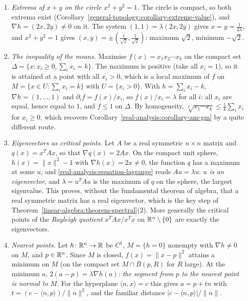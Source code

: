 \begin{example}\label{real-analysis:example-lagrange}
\begin{enumerate}
\item \emph{Extrema of $x + y$ on the circle $x^2 + y^2 = 1$.} The circle is compact, so both extrema exist (Corollary~\ref{general-topology:corollary-extreme-value}), and $\nabla h = (2x, 2y) \neq 0$ on it.
The system $(1, 1) = \lambda(2x, 2y)$ gives $x = y = \frac1{2\lambda}$, and $x^2 + y^2 = 1$ gives $(x, y) = \pm(\frac1{\sqrt2}, \frac1{\sqrt2})$: maximum $\sqrt2$, minimum $-\sqrt2$.
\item \emph{The inequality of the means.} Maximise $f(x) = x_1x_2\cdots x_k$ on the compact set $\Delta = \{x : x_i \geq 0, \sum_ix_i = k\}$. The maximum is positive (take all $x_i = 1$), so it is attained at a
point with all $x_i > 0$, which is a local maximum of $f$ on $M = \{x \in U : \sum_ix_i = k\}$ with $U = \{x_i > 0\}$. With $h = \sum_ix_i - k$, $\nabla h = (1, \ldots, 1)$ and
$\partial_if = f(x)/x_i$, so $f(x)/x_i = \lambda$ for all $i$: all $x_i$ are equal, hence equal to $1$, and $f \leq 1$ on $\Delta$. By homogeneity, $\sqrt[k]{x_1\cdots x_k} \leq \frac1k\sum_ix_i$ for $x_i \geq 0$,
which recovers Corollary~\ref{real-analysis:corollary-am-gm} by a quite different route.
\item \emph{Eigenvectors as critical points.} Let $A$ be a real symmetric $n \times n$ matrix and $q(x) = x^TAx$, so that $\nabla q(x) = 2Ax$. On the compact unit sphere, $h(x) = \|x\|^2 - 1$ with
$\nabla h(x) = 2x \neq 0$, the function $q$ has a maximum at some $u$, and \eqref{real-analysis:equation-lagrange} reads $Au = \lambda u$: \emph{$u$ is an eigenvector}, and $\lambda = u^TAu$ is the maximum
of $q$ on the sphere, the largest eigenvalue. This proves, without the fundamental theorem of algebra, that a real symmetric matrix has a real eigenvector, which is the key step of
Theorem~\ref{linear-algebra:theorem-spectral}(2). More generally the critical points of the \emph{Rayleigh quotient} $x^TAx/x^Tx$ on $\mathbb{R}^n \setminus \{0\}$ are exactly the eigenvectors.
\item \emph{Nearest points.} Let $h \colon \mathbb{R}^n \to \mathbb{R}$ be $C^1$, $M = \{h = 0\}$ nonempty with $\nabla h \neq 0$ on $M$, and $p \in \mathbb{R}^n$. Since $M$ is closed, $f(x) = \|x - p\|^2$ attains a minimum on
$M$ (on the compact set $M \cap \overline{B}(p, R)$ for $R$ large). At the minimum $a$, $2(a - p) = \lambda\nabla h(a)$: \emph{the segment from $p$ to the nearest point is normal to $M$}. For the hyperplane
$\langle n, x\rangle = c$ this gives $a = p + tn$ with $t = (c - \langle n, p\rangle)/\|n\|^2$, and the familiar distance $|c - \langle n, p\rangle|/\|n\|$.
\end{enumerate}
\end{example}

